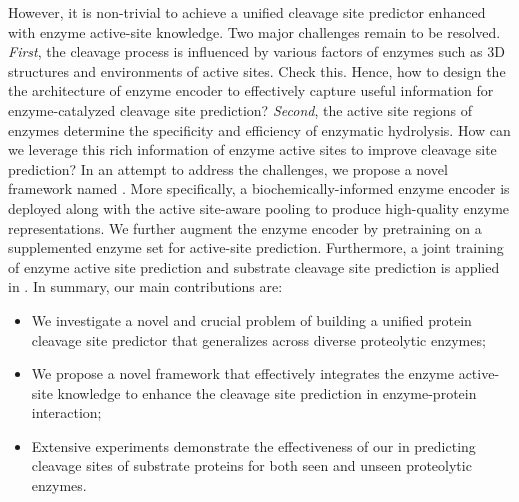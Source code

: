 However, it is non-trivial to achieve a unified cleavage site predictor enhanced with enzyme active-site knowledge. Two major challenges remain to be resolved. \textit{First}, the cleavage process is influenced by various factors of enzymes such as 3D structures and environments of active sites. Check this.
Hence, how to design the the architecture of enzyme encoder to effectively capture useful information for enzyme-catalyzed cleavage site prediction? \textit{Second}, the active site regions of enzymes determine the specificity and efficiency of enzymatic hydrolysis. How can we leverage this rich information of enzyme active sites to improve cleavage site prediction? In an attempt to address the challenges, we propose a novel framework named {\method}. More specifically, a biochemically-informed enzyme encoder is deployed along with the active site-aware pooling to produce high-quality enzyme representations. We further augment the enzyme encoder by pretraining on a supplemented enzyme set for active-site prediction. Furthermore, a joint training of enzyme active site prediction and substrate cleavage site prediction is applied in {\method}. 
In summary, our main contributions are:
\begin{itemize} [leftmargin=*]
    \item We investigate a novel and crucial problem of building a unified protein cleavage site predictor that generalizes across diverse proteolytic enzymes;
    \item We propose a novel framework {\method} that effectively integrates the enzyme active-site knowledge to enhance the cleavage site prediction in enzyme-protein interaction;
    \item Extensive experiments demonstrate the effectiveness of our {\method} in predicting cleavage sites of substrate proteins for both seen and unseen proteolytic enzymes.
\end{itemize}

